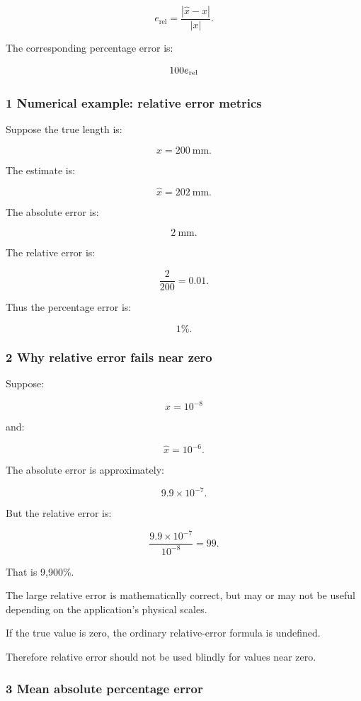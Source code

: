 \[
 \boxed{ e_{\mathrm{rel}} = \frac{|\hat x-x|}{|x|} }.
\]

The corresponding percentage error is:

\[
 100e_{\mathrm{rel}}\\%
\]

\subsubsection{1 Numerical example: relative error metrics}\label{02-foundations-ii-ch030-numerical-example-relative-error-metrics}

Suppose the true length is:

\[
 x=200\ \mathrm{mm}.
\]

The estimate is:

\[
 \hat x=202\ \mathrm{mm}.
\]

The absolute error is:

\[
 2\ \mathrm{mm}.
\]

The relative error is:

\[
 \frac2{200}=0.01.
\]

Thus the percentage error is:

\[
 \boxed{1\%}.
\]

\subsubsection{2 Why relative error fails near zero}\label{02-foundations-ii-ch030-why-relative-error-fails-near-zero}

Suppose:

\[
 x=10^{-8}
\]

and:

\[
 \hat x=10^{-6}.
\]

The absolute error is approximately:

\[
 9.9\times10^{-7}.
\]

But the relative error is:

\[
 \frac{9.9\times10^{-7}}{10^{-8}} =99.
\]

That is 9,900\%.

The large relative error is mathematically correct, but may or may not be useful depending on the application's physical scales.

If the true value is zero, the ordinary relative-error formula is undefined.

Therefore relative error should not be used blindly for values near zero.

\subsubsection{3 Mean absolute percentage error}\label{02-foundations-ii-ch030-mean-absolute-percentage-error}

